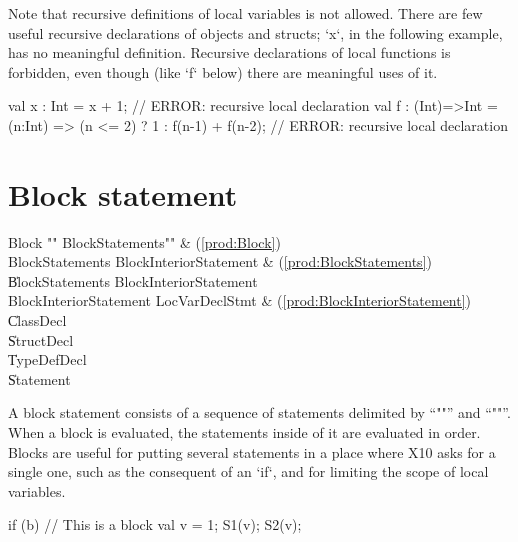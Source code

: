 \begin{ex}
Note that recursive definitions of local variables is not allowed.  There are
few useful recursive declarations of objects and structs; \xcd`x`, in the
following example, has no meaningful definition.  Recursive declarations of
local functions is forbidden, even though (like \xcd`f` below) there are
meaningful uses of it.  
\begin{xten}
val x : Int = x + 1; // ERROR: recursive local declaration
val f : (Int)=>Int 
      = (n:Int) => (n <= 2) ? 1 : f(n-1) + f(n-2);
      // ERROR: recursive local declaration
\end{xten}

\end{ex}



\section{Block statement}
\label{Blocks}

\begin{bbgrammar}
               Block \: \xcd"{" BlockStatements\opt \xcd"}" & (\ref{prod:Block}) \\
     BlockStatements \: BlockInteriorStatement & (\ref{prod:BlockStatements}) \\
                     \| BlockStatements BlockInteriorStatement \\
BlockInteriorStatement \: LocVarDeclStmt & (\ref{prod:BlockInteriorStatement}) \\
                     \| ClassDecl \\
                     \| StructDecl \\
                     \| TypeDefDecl \\
                     \| Statement \\
\end{bbgrammar}


A block statement consists of a sequence of statements delimited by
``\xcd"{"'' and ``\xcd"}"''. When a block is evaluated, the statements inside
of it are evaluated in order.  Blocks are useful for putting several
statements in a place where X10 asks for a single one, such as the consequent
of an \xcd`if`, and for limiting the scope of local variables.
\begin{xten}
if (b) {
  // This is a block
  val v = 1;
  S1(v); 
  S2(v);
}
\end{xten}



